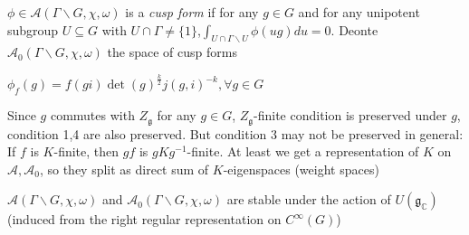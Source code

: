 \documentclass[main]{subfiles}
\begin{document}
\begin{definition}
$\phi\in\mathcal A(\Gamma\backslash G,\chi,\omega)$ is a \textit{cusp form} if for any $g\in G$ and for any unipotent subgroup $U\subseteq G$ with $U\cap\Gamma\neq\{1\}$,$\int_{U\cap\Gamma\backslash U}\phi(ug)du=0$. Deonte $\mathcal A_0(\Gamma\backslash G,\chi,\omega)$ the space of cusp forms
\end{definition}

\begin{example}
$\phi_f(g)=f(gi)\det(g)^{\frac{k}{2}}j(g,i)^{-k},\forall g\in G$
\begin{center}
\end{center}
\end{example}

\begin{remark}
Since $g$ commutes with $Z_{\mathfrak g}$ for any $g\in G$, $Z_{\mathfrak g}$-finite condition is preserved under $g$, condition 1,4 are also preserved. But condition 3 may not be preserved in general: If $f$ is $K$-finite, then $gf$ is $gKg^{-1}$-finite. At least we get a representation of $K$ on $\mathcal A,\mathcal A_0$, so they split as direct sum of $K$-eigenspaces (weight spaces)
\end{remark}

\begin{theorem}
$\mathcal A(\Gamma\backslash G,\chi,\omega)$ and $\mathcal A_0(\Gamma\backslash G,\chi,\omega)$ are stable under the action of $U(\mathfrak g_{\mathbb C})$ (induced from the right regular representation on $C^\infty(G)$)
\end{theorem}
\end{document}

